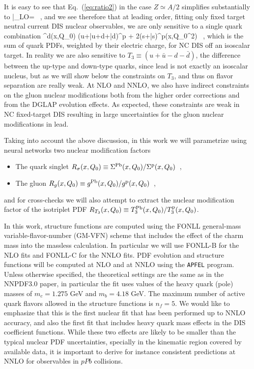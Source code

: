 It is easy to see that Eq.~(\ref{eq:ratio2}) in the case $Z\simeq A/2$ simplifies
substantially to
\be
\label{eq:ratio3}
\Bigg|_{\rm LO}=
 \, ,
\ee
and we see therefore that at leading order, fitting only fixed target neutral
current DIS nuclear observables, we are only sensitive to a single
quark combination
\be
\Sigma^{\rm d}(x,Q_0) \equiv {}(u+\bar{u}+d+\bar{d})^{\rm p} + 2(s+\bar{s})^{\rm p}\rp(x,Q_0^2) \ ,
\ee
which is the sum of quark PDFs, weighted by their electric charge, for NC DIS
off an isoscalar target.
%
In reality we are also sensitive to $T_3\equiv ( u+\bar{u} - d-\bar{d})$, the difference
between the up-type and down-type quarks, since lead is not exactly an isoscalar
nucleus, but as we will show below the constraints on $T_3$, and
thus on flavor separation are really weak.
%
At NLO and NNLO, we also have indirect constraints on the gluon nuclear modifications
both from the higher order corrections and from the DGLAP evolution effects.
%
As expected, these constraints are weak in NC fixed-target DIS resulting in large
uncertainties for the gluon nuclear modifications in lead.

Taking into account the above discussion, in this work we will parametrize
using neural networks two nuclear modification factors
\begin{itemize}
\item The quark singlet
  $R_{\sigma}(x,Q_0) \equiv  \Sigma^{\rm Pb}(x,Q_0) / \Sigma^{\rm p}(x,Q_0)\,$ ,
\item The gluon
   $R_{g}(x,Q_0) \equiv  g^{\rm Pb}(x,Q_0) / g^{\rm p}(x,Q_0)\,$ ,
\end{itemize}
and for cross-checks we will also attempt to extract
the nuclear modification factor of the isotriplet PDF
$R_{T_3}(x,Q_0) \equiv  T_3^{\rm Pb}(x,Q_0) / T_3^{\rm p}(x,Q_0)$.


In this work, structure functions are computed using the FONLL
general-mass variable-flavor-number (GM-VFN) scheme that
includes the effect of the charm mass into the massless calculation.
%
In particular we will use FONLL-B for the NLO fits and FONLL-C
for the NNLO fits.
%
PDF evolution and structure functions will be computed at NLO and at NNLO
using the {\tt APFEL} program.
%
Unless otherwise specified, the theoretical settings are the same
as in the NNPDF3.0 paper, in particular the fit uses values of the heavy
quark (pole) masses of $m_c=1.275$ GeV and $m_b=4.18$ GeV.
%
The maximum number of active quark flavors allowed in the structure
functions is $n_f=5$.
%
We would like to emphasize that
this is the first nuclear fit that has been performed
up to NNLO accuracy, and also the first fit that includes heavy quark mass effects
in the DIS coefficient functions.
%
While these two effects are likely to be smaller than the typical
nuclear PDF uncertainties, specially in the kinematic region
covered by available data, it is important to derive for
instance consistent predictions at NNLO for observables
in $pPb$ collisions.




